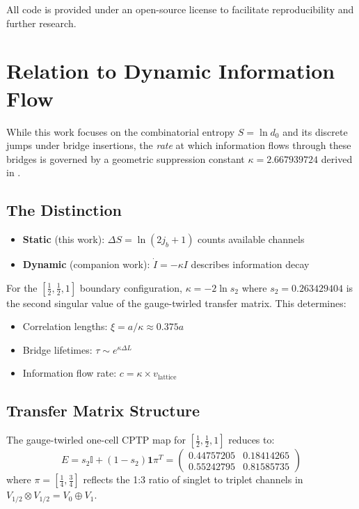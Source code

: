 \documentclass[11pt, a4paper]{article}
\theoremstyle{plain}
\theoremstyle{definition}
\theoremstyle{remark}
\begin{document}
All code is provided under an open-source license to facilitate reproducibility and further research.

\section{Relation to Dynamic Information Flow}
\label{app:kappa}

While this work focuses on the combinatorial entropy $S = \ln d_0$ and its discrete jumps under bridge insertions, the \emph{rate} at which information flows through these bridges is governed by a geometric suppression constant $\kappa = 2.667939724$ derived in \cite{SandozOperatorAlgebraic2025}.

\subsection{The Distinction}

\begin{itemize}
  \item \textbf{Static} (this work): $\Delta S = \ln(2j_b + 1)$ counts available channels
  \item \textbf{Dynamic} (companion work): $\dot{I} = -\kappa I$ describes information decay
\end{itemize}

For the $[\frac{1}{2}, \frac{1}{2}, 1]$ boundary configuration, $\kappa = -2\ln s_2$ where $s_2 = 0.263429404$ is the second singular value of the gauge-twirled transfer matrix. This determines:
\begin{itemize}
  \item Correlation lengths: $\xi = a/\kappa \approx 0.375a$
  \item Bridge lifetimes: $\tau \sim e^{\kappa \Delta L}$
  \item Information flow rate: $c = \kappa \times v_{\text{lattice}}$
\end{itemize}

\subsection{Transfer Matrix Structure}

The gauge-twirled one-cell CPTP map for $[\frac{1}{2}, \frac{1}{2}, 1]$ reduces to:
\begin{equation}
  E = s_2 \mathbb{I} + (1 - s_2) \mathbf{1} \pi^T =
  \begin{pmatrix}
    0.44757205 & 0.18414265 \\
    0.55242795 & 0.81585735
  \end{pmatrix}
\end{equation}
where $\pi = [\frac{1}{4}, \frac{3}{4}]$ reflects the 1:3 ratio of singlet to triplet channels in $V_{1/2} \otimes V_{1/2} = V_0 \oplus V_1$.
\end{document}
